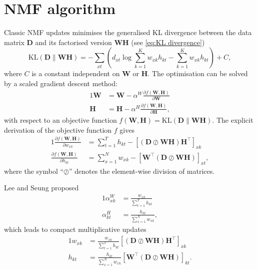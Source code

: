\chapter{NMF algorithm\label{app:NMF-algorithm}}

Classic NMF updates \cite{Lee2001} minimises the generalised KL divergence between the data matrix $\bm{D}$ and its factorised version $\bm{WH}$ (see \autoref{eq:KL divergence})
%
\begin{equation}
	\mbox{KL}(\bm{D}\parallel\bm{WH})=-\sum_{xt}\left(d_{xt}\log\sum_{k=1}^{K}w_{xk}h_{kt}-\sum_{k=1}^{K}w_{xk}h_{kt}\right)+C,
\end{equation}
where $C$ is a constant independent on $\bm{W}$ or $\bm{H}$. The optimisation can be solved by a scaled gradient descent method:
%
\begin{alignat}{1}
	\bm{W} & =\bm{W}-\alpha^{W}\frac{\partial f(\bm{W,H})}{\partial \bm{W}}\nonumber \\
	\bm{H} & =\bm{H}-\alpha^{H}\frac{\partial f(\bm{W,H})}{\partial \bm{H}},
	\label{eq:gradient descend}
\end{alignat}
%
with respect to an objective function $f(\bm{W,H})=\mbox{KL}(\bm{D}\parallel\bm{WH})$. The explicit derivation of the objective function $f$ gives
%
\begin{alignat}{1}
	\frac{\partial f(\bm{W,H})}{\partial w_{xk}} & =\sum_{t=1}^{T}h_{kt}-\left[(\bm{D}\oslash\bm{WH})\bm{H}^{\top}\right]_{xk}\nonumber \\
	\frac{\partial f(\bm{W,H})}{\partial h_{kt}} & =\sum_{x=1}^{N}w_{xk}-\left[\bm{W^{\top}}(\bm{D}\oslash\bm{WH})\right]_{xt},
	\label{eq:gradients}
\end{alignat}
%
where the symbol ``$\oslash$'' denotes the element-wise division of matrices. 

Lee and Seung \cite{Lee2001} proposed 
%
\begin{alignat}{1}
	\alpha_{xk}^{W} & =\frac{w_{xk}}{\sum_{t=1}^{T}h_{kt}}\nonumber \\
	\alpha_{kt}^{H} & =\frac{h_{kt}}{\sum_{x=1}^{N}w_{xk}},
	\label{eq:alphas}
\end{alignat}
%
which leads to compact multiplicative updates
%
\begin{alignat}{1}
	w_{xk} & =\frac{w_{xk}}{\sum_{t=1}^{T}h_{kt}}\left[(\bm{D}\oslash\bm{WH})\bm{H^{\top}}\right]_{xk}\nonumber \\
	h_{kt} & =\frac{h_{kt}}{\sum_{x=1}^{N}w_{xk}}\left[\bm{W^{\top}}(\bm{D}\oslash\bm{WH})\right]_{kt}.
	\label{eq:classic updates}
\end{alignat}
%

